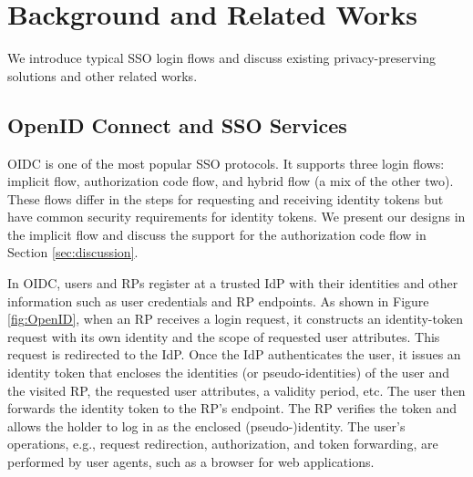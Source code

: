 \section{Background and Related Works}
\label{sec:background}

We introduce %
typical SSO login flows and discuss existing privacy-preserving solutions and other related works.

\subsection{OpenID Connect and SSO Services}
\label{subsec:OIDC}
OIDC is one of the most popular SSO protocols. It supports three login flows: implicit flow, authorization code flow, and hybrid flow (a mix of the other two). These flows differ in the steps for requesting and receiving identity tokens but have common security requirements for identity tokens. We present our designs in the implicit flow and discuss the support for the authorization code flow in Section \ref{sec:discussion}.

In OIDC, users and RPs register at a trusted IdP with their identities
and other information such as user credentials %
and RP endpoints. %
As shown in Figure \ref{fig:OpenID}, when an RP receives a login request, it constructs an identity-token request with its own identity and the scope of requested user attributes.
This request is redirected to the IdP. Once the IdP authenticates the user, it issues an identity token that encloses the identities (or pseudo-identities) of the user and the visited RP, the requested user attributes, a validity period, etc. The user then forwards the identity token to the RP's endpoint. The RP verifies the token and allows the holder to log in as the enclosed (pseudo-)identity. The user's operations, e.g., request redirection, authorization, and token forwarding, are performed by user agents, such as a browser for web applications.

